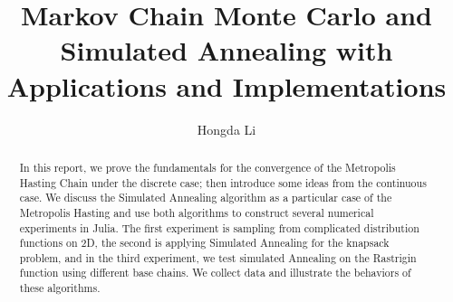 \documentclass[]{article}
\title{Markov Chain Monte Carlo and Simulated Annealing with Applications and Implementations}
\author{Hongda Li}
\theoremstyle{definition}
\begin{document}
\maketitle
\begin{abstract}
    In this report, we prove the fundamentals for the convergence of the Metropolis Hasting Chain under the discrete case; then introduce some ideas from the continuous case. We discuss the Simulated Annealing algorithm as a particular case of the Metropolis Hasting and use both algorithms to construct several numerical experiments in Julia. The first experiment is sampling from complicated distribution functions on 2D, the second is applying Simulated Annealing for the knapsack problem, and in the third experiment, we test simulated Annealing on the Rastrigin function using different base chains. We collect data and illustrate the behaviors of these algorithms. 
\end{abstract}

\end{document}
